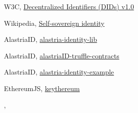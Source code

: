 \documentclass[target=mst,aauheader=]{thud}
\begin{document}
\begin{thebibliography}{99}

    W3C, \href{https://w3c.github.io/did-core/}{Decentralized Identifiers (DIDs) v1.0}

    Wikipedia, \href{https://en.wikipedia.org/wiki/Self-sovereign_identity}{Self-sovereign identity}

    AlastriaID, \href{https://github.com/alastria/alastria-identity-lib}{alastria-identity-lib}

    AlastriaID, \href{https://github.com/alastria/alastriaID-truffle-contracts}{alastriaID-truffle-contracts}

    AlastriaID, \href{https://github.com/alastria/alastria-identity-example}{alastria-identity-example}

    EthereumJS, \href{https://github.com/ethereumjs/keythereum}{keythereum}

    \bibitem{}
    , \href{}{}

\end{thebibliography}

\end{document}

